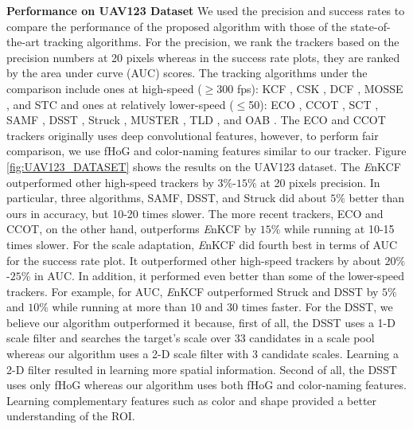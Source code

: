 \documentclass[10pt,twocolumn,letterpaper]{article}
\begin{document}
\textbf{Performance on UAV123 Dataset} We used the precision and
success rates to compare the performance of the proposed algorithm
with those of the state-of-the-art tracking algorithms. For the
precision, we rank the trackers based on the precision numbers at 20
pixels whereas in the success rate plots, they are ranked by the area
under curve (AUC) scores. The tracking algorithms under the comparison
include ones at high-speed ($\geq$300 fps): KCF
\cite{henriques2015high}, CSK \cite{henriques2012exploiting}, DCF
\cite{henriques2015high}, MOSSE \cite{bolme2010visual}, and STC
\cite{zhang2014fast} and ones at relatively lower-speed ($\leq$50):
ECO \cite{DanelljanCVPR2017}, CCOT \cite{DanelljanECCV2016}, SCT
\cite{Choi_2016_CVPR}, SAMF \cite{li2014scale}, DSST
\cite{danelljan2014accurate}, Struck \cite{hare2012efficient}, MUSTER
\cite{hong2015multi}, TLD \cite{kalal2012tracking}, and OAB
\cite{zhang2012robust}. The ECO and CCOT trackers originally uses deep
convolutional features, however, to perform fair comparison, we use
fHoG and color-naming features similar to our tracker. Figure
\ref{fig:UAV123_DATASET} shows the results on the UAV123 dataset. The
    {\it E}nKCF outperformed other high-speed trackers by $3\%$-$15\%$
    at 20 pixels precision. In particular, three algorithms, SAMF,
    DSST, and Struck did about $5\%$ better than ours in accuracy, but
    10-20 times slower. The more recent trackers, ECO and CCOT, on the
    other hand, outperforms {\it E}nKCF by $15\%$ while running at
    10-15 times slower. For the scale adaptation, {\it E}nKCF did
    fourth best in terms of AUC for the success rate plot. It
    outperformed other high-speed trackers by about $20\%$-$25\%$ in
    AUC. In addition, it performed even better than some of the
    lower-speed trackers.  For example, for AUC, {\it E}nKCF
    outperformed Struck and DSST by $5\%$ and $10\%$ while running at
    more than $10$ and $30$ times faster. For the DSST, we believe our
    algorithm outperformed it because, first of all, the DSST uses a
    1-D scale filter and searches the target's scale over 33
    candidates in a scale pool whereas our algorithm uses a 2-D scale
    filter with 3 candidate scales. Learning a 2-D filter resulted in
    learning more spatial information. Second of all, the DSST uses
    only fHoG whereas our algorithm uses both fHoG and color-naming
    features. Learning complementary features such as color and shape
    provided a better understanding of the ROI.
    
\end{document}
